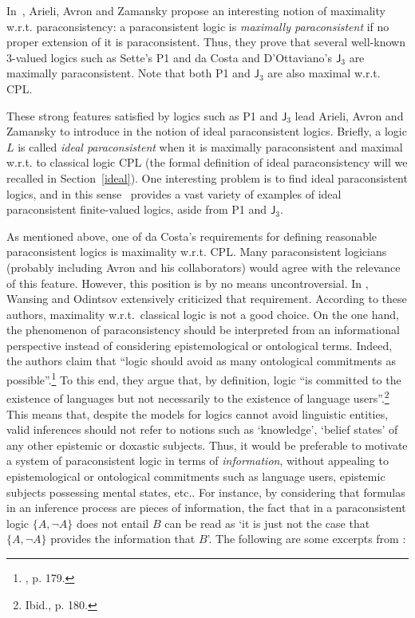 \documentclass{article}
\theoremstyle{definition}
\begin{document}
In~\cite{ArieliAZ10}, Arieli, Avron and Zamansky propose an interesting notion of maximality w.r.t. paraconsistency: a paraconsistent logic is {\em maximally paraconsistent} if no proper extension of it is paraconsistent. Thus, they prove that
several well-known 3-valued logics such as Sette's P1 and da Costa and D'Ottaviano's  $\mathsf{J}_3$ are maximally paraconsistent. Note that both P1 and  $\mathsf{J}_3$ are also maximal w.r.t. CPL.


These strong features satisfied by logics such as  P1 and  $\mathsf{J}_3$ lead
Arieli, Avron and Zamansky  to introduce  in \cite{ArieliAZ11a} the notion of ideal paraconsistent logics.  Briefly,  a logic $L$ is called {\em ideal  paraconsistent} when it is maximally paraconsistent and maximal w.r.t.  to classical logic CPL (the formal definition of ideal paraconsistency will we recalled in Section~\ref{ideal}). One interesting problem is to find ideal paraconsistent logics, and in this sense~\cite{ArieliAZ11a} provides a vast variety of examples of ideal paraconsistent finite-valued logics, aside from P1 and $\mathsf{J}_3$.

As mentioned above, one of da Costa's requirements for defining reasonable paraconsistent logics is  maximality w.r.t. CPL. Many paraconsistent logicians (probably including Avron and his collaborators) would agree with the relevance of this feature. However, this position is by no means uncontroversial.
In \cite{WansOdin}, Wansing and Odintsov extensively  criticized that requirement. According to these authors, maximality w.r.t.\ classical logic is not a good choice. On the one hand,  the phenomenon of paraconsistency should be interpreted from an  informational perspective instead of considering epistemological or ontological terms. Indeed, the authors claim that ``logic should avoid as many ontological commitments as possible''.\footnote{\cite{WansOdin}, p. 179.}  To this end, they argue that, by definition, logic ``is committed to the existence of languages but not necessarily to the existence of language users''.\footnote{Ibid., p. 180.} This means that, despite the models for logics cannot avoid  linguistic entities, valid inferences should not refer to notions such as `knowledge', `belief states' of any other epistemic or doxastic subjects. Thus, it would be preferable to motivate a system of paraconsistent logic in terms of {\em information},  without appealing to epistemological or ontological commitments such as language users, epistemic subjects possessing mental states, etc.. For instance,  by considering that formulas in an inference process are  pieces of information, the fact that in a paraconsistent logic $\{A, \neg A\}$ does not entail $B$ can be read as `it is just not the case that $\{A, \neg A\}$ provides the information that $B$'. The following are some excerpts from  \cite{WansOdin}:
\end{document}
